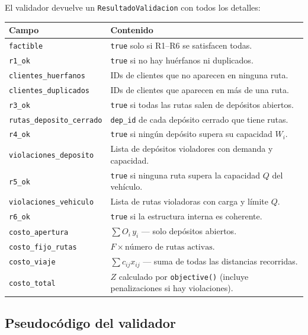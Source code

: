 \documentclass[12pt,a4paper]{article}
\begin{document}
El validador devuelve un \texttt{ResultadoValidacion} con todos los detalles:

\begin{center}
\renewcommand{\arraystretch}{1.3}
\begin{tabular}{lp{8.5cm}}
\toprule
Campo & Contenido \\
\midrule
\texttt{factible} & \texttt{true} solo si R1--R6 se satisfacen todas. \\
\texttt{r1\_ok} & \texttt{true} si no hay huérfanos ni duplicados. \\
\texttt{clientes\_huerfanos} & IDs de clientes que no aparecen en ninguna ruta. \\
\texttt{clientes\_duplicados} & IDs de clientes que aparecen en más de una ruta. \\
\texttt{r3\_ok} & \texttt{true} si todas las rutas salen de depósitos abiertos. \\
\texttt{rutas\_deposito\_cerrado} & \texttt{dep\_id} de cada depósito cerrado que tiene rutas. \\
\texttt{r4\_ok} & \texttt{true} si ningún depósito supera su capacidad $W_i$. \\
\texttt{violaciones\_deposito} & Lista de depósitos violadores con demanda y capacidad. \\
\texttt{r5\_ok} & \texttt{true} si ninguna ruta supera la capacidad $Q$ del vehículo. \\
\texttt{violaciones\_vehiculo} & Lista de rutas violadoras con carga y límite $Q$. \\
\texttt{r6\_ok} & \texttt{true} si la estructura interna es coherente. \\
\texttt{costo\_apertura} & $\sum O_i \, y_i$ — solo depósitos abiertos. \\
\texttt{costo\_fijo\_rutas} & $F \times \text{número de rutas activas}$. \\
\texttt{costo\_viaje} & $\sum c_{ij} x_{ij}$ — suma de todas las distancias recorridas. \\
\texttt{costo\_total} & $Z$ calculado por \texttt{objective()} (incluye penalizaciones si hay violaciones). \\
\bottomrule
\end{tabular}
\end{center}

\subsection{Pseudocódigo del validador}
\end{document}
